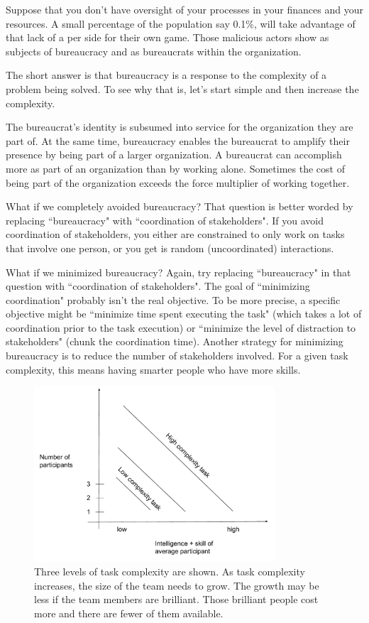 Suppose that you don't have oversight of your processes in your finances and your resources. A small percentage of the population say 0.1\%, will take advantage of that lack of a per side for their own game. Those malicious actors show as subjects of bureaucracy and as bureaucrats within the organization. 




The short answer is that bureaucracy is a response to the complexity of a problem being solved. To see why that is, let's start simple and then increase the complexity. 



The bureaucrat's identity is subsumed into service for the organization they are part of. At the same time, bureaucracy enables the bureaucrat to amplify their presence by being part of a larger organization. A bureaucrat can accomplish more as part of an organization than by working alone. Sometimes the cost of being part of the organization exceeds the force multiplier of working together. 


What if we completely avoided bureaucracy? That question is better worded by replacing ``bureaucracy" with ``coordination of stakeholders". If you avoid coordination of stakeholders, you either are constrained to only work on tasks that involve one person, or you get is random (uncoordinated) interactions. 

What if we minimized bureaucracy? Again, try replacing ``bureaucracy" in that question with ``coordination of stakeholders". The goal of ``minimizing coordination" probably isn't the real objective. To be more precise, a specific objective might be ``minimize time spent executing the task" (which takes a lot of coordination prior to the task execution) or ``minimize the level of distraction to stakeholders" (chunk the coordination time). Another strategy for minimizing bureaucracy is to reduce the number of stakeholders involved. For a given task complexity, this means having smarter people who have more skills. 

\begin{figure}
\includegraphics[width=0.8\textwidth]{images/people-per-task-for-skill-level.pdf}
\caption{Three levels of task complexity are shown. As task complexity increases, the size of the team needs to grow. The growth may be less if the team members are brilliant. Those brilliant people cost more and there are fewer of them available.}
\end{figure}
